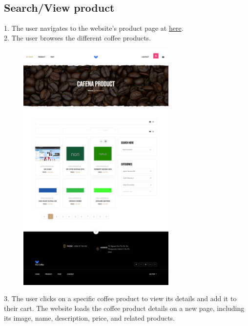 \subsection{Search/View product}
1. The user navigates to the website's product page at \href{https://coffee.skrt.cc/}{here}. \\
2. The user browses the different coffee products.\\
\begin{figure}[H]
    \centering
    \includegraphics[width=0.7\textwidth]{Demo/Product.png}
    \label{fig:productpage}
\end{figure}
3. The user clicks on a specific coffee product to view its details and add it to their cart. The website loads the coffee product details on a new page, including its image, name, description, price, and related products. \\
